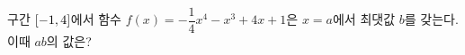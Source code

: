구간 $[-1{,}\mkern3mu\mathopen{}4]$에서 함수 $f(x)=-\dfrac{1}{4}x^4-x^3+4x+1$은 $x=a$에서 최댓값 $b$를 갖는다. 이때 $ab$의 값은?
